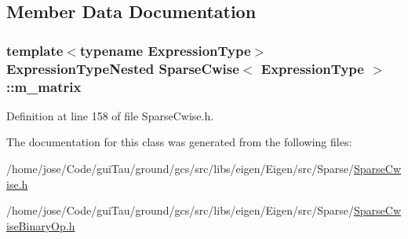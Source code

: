 \subsection{Member Data Documentation}
\hypertarget{class_sparse_cwise_a64c10cb80091ee64fe3a4392c7bc6d25}{
\subsubsection[{m\-\_\-matrix}]{\setlength{\rightskip}{0pt plus 5cm}template$<$typename Expression\-Type$>$ {\bf Expression\-Type\-Nested} {\bf Sparse\-Cwise}$<$ Expression\-Type $>$\-::m\-\_\-matrix\hspace{0.3cm}{\ttfamily [protected]}}}\label{class_sparse_cwise_a64c10cb80091ee64fe3a4392c7bc6d25}


Definition at line 158 of file Sparse\-Cwise.\-h.



The documentation for this class was generated from the following files\-:\begin{DoxyCompactItemize}
\item 
/home/jose/\-Code/gui\-Tau/ground/gcs/src/libs/eigen/\-Eigen/src/\-Sparse/\hyperlink{_sparse_cwise_8h}{Sparse\-Cwise.\-h}\item 
/home/jose/\-Code/gui\-Tau/ground/gcs/src/libs/eigen/\-Eigen/src/\-Sparse/\hyperlink{_sparse_cwise_binary_op_8h}{Sparse\-Cwise\-Binary\-Op.\-h}\end{DoxyCompactItemize}
